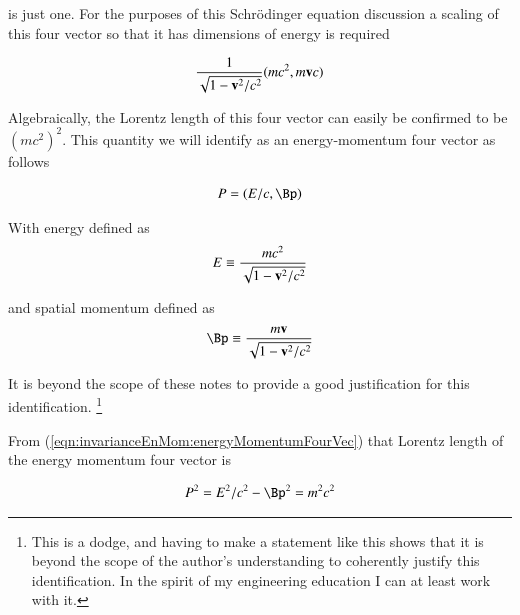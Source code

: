 is just one.  For the purposes of this 
Schr\"{o}dinger equation
discussion a scaling of this four vector so that it has dimensions of energy is required

\begin{align}
\frac{1}{\sqrt{1 - \mathbf{v}^2/c^2}}(m c^2, m\mathbf{v} c)
\end{align}

Algebraically, the Lorentz length of this four vector can easily be confirmed to be $(m c^2)^2$.  This quantity 
we will identify as an energy-momentum four vector as follows

\begin{align}\label{eqn:invarianceEnMom:energyMomentumFourVec}
P = (E/c, \Bp)
\end{align}

With energy defined as
\begin{align}
E \equiv \frac{m c^2}{\sqrt{1 - \mathbf{v}^2/c^2}}
\end{align}

and spatial momentum defined as
\begin{align}
\Bp \equiv \frac{m \Bv}{\sqrt{1 - \Bv^2/c^2}}
\end{align}

It is beyond the scope of these notes to provide a good justification for this identification.
\footnote{This is a dodge, and having to make a statement like this shows that it is beyond the scope of the author's understanding to coherently justify this identification.  In the spirit of my engineering education I can at least work with it.}

From (\ref{eqn:invarianceEnMom:energyMomentumFourVec}) that Lorentz length of the
energy momentum four vector is

\begin{align}
P^2 = E^2/c^2 - \Bp^2 = m^2 c^2
\end{align}
